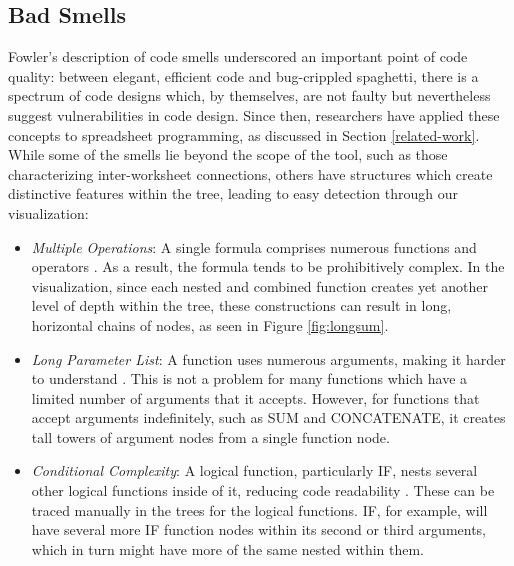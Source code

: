 \documentclass[conference]{IEEEtran}
\begin{document}
	\subsection{Bad Smells} \label{badsmells} Fowler's description of code smells
	\cite{fowler2009refactoring} underscored an important point of code quality:
	between elegant, efficient code and bug-crippled spaghetti, there is a spectrum
	of code designs which, by themselves, are not faulty but nevertheless suggest
	vulnerabilities in code design. Since then, researchers have applied these
	concepts to spreadsheet programming, as discussed in Section
	\ref{related-work}. While some of the smells lie beyond the scope of the tool,
	such as those characterizing inter-worksheet connections, others have
	structures which create distinctive features within the tree, leading to easy
	detection through our visualization: \par
	
	\begin{itemize}
		
		\item \textit{Multiple Operations}: A single formula comprises numerous
		functions and operators \cite{hermans2012detecting}. As a result, the formula
		tends to be prohibitively complex. In the visualization, since each nested and
		combined function creates yet another level of depth within the tree, these
		constructions can result in long, horizontal chains of nodes, as seen in
		Figure \ref{fig:longsum}.
		
		\item \textit{Long Parameter List}: A function uses numerous arguments, making
		it harder to understand \cite{asavametha2012detecting}. This is not a problem
		for many functions which have a limited number of arguments that it accepts.
		However, for functions that accept arguments indefinitely, such as SUM and
		CONCATENATE, it creates tall towers of argument nodes from a single function
		node.
		
		\item \textit{Conditional Complexity}: A logical function, particularly IF,
		nests several other logical functions inside of it, reducing code readability
		\cite{hermans2012detecting}. These can be traced manually in the trees for the
		logical functions. IF, for example, will have several more IF function nodes
		within its second or third arguments, which in turn might have more of the
		same nested within them.
		
	\end{itemize}
	
\end{document}
